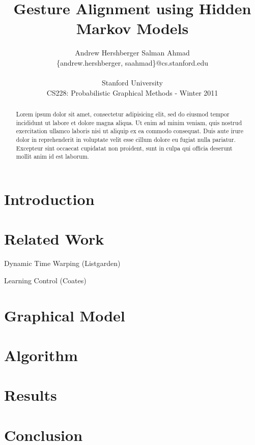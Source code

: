 \documentclass{article}
\title{Gesture Alignment using Hidden Markov Models}
\author{
Andrew Hershberger
\quad Salman Ahmad \\
\{andrew.hershberger, saahmad\}@cs.stanford.edu
\\\\
Stanford University\\
CS228: Probabilistic Graphical Methods - Winter 2011\\
}
\begin{document}
\maketitle

\begin{abstract}


Lorem ipsum dolor sit amet, consectetur adipisicing elit, sed do eiusmod
tempor incididunt ut labore et dolore magna aliqua. Ut enim ad minim veniam,
quis nostrud exercitation ullamco laboris nisi ut aliquip ex ea commodo
consequat. Duis aute irure dolor in reprehenderit in voluptate velit esse
cillum dolore eu fugiat nulla pariatur. Excepteur sint occaecat cupidatat non
proident, sunt in culpa qui officia deserunt mollit anim id est laborum.

\end{abstract}

\section{Introduction}

\section{Related Work}

Dynamic Time Warping (Listgarden)



Learning Control (Coates) \cite{Coates2008}

\section{Graphical Model}

\section{Algorithm}

\section{Results}

\section{Conclusion}





\end{document}
